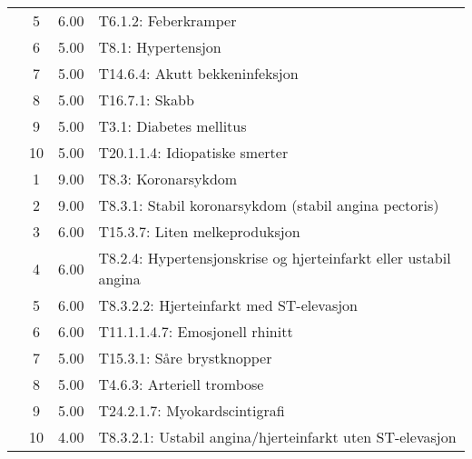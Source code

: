 \begin{table}[htbp]
\begin{tabular}{c c c l}
     & 5 & 6.00 & T6.1.2: Feberkramper \\
     & 6 & 5.00 & T8.1: Hypertensjon \\
     & 7 & 5.00 & T14.6.4: Akutt bekkeninfeksjon \\
     & 8 & 5.00 & T16.7.1: Skabb \\
     & 9 & 5.00 & T3.1: Diabetes mellitus \\
     & 10 & 5.00 & T20.1.1.4: Idiopatiske smerter \\
	\addlinespace
    4 & 1 & 9.00 & T8.3: Koronarsykdom \\
     & 2 & 9.00 & T8.3.1: Stabil koronarsykdom (stabil angina pectoris) \\
     & 3 & 6.00 & T15.3.7: Liten melkeproduksjon \\
     & 4 & 6.00 & T8.2.4: Hypertensjonskrise og hjerteinfarkt eller ustabil angina \\
     & 5 & 6.00 & T8.3.2.2: Hjerteinfarkt med ST-elevasjon \\
     & 6 & 6.00 & T11.1.1.4.7: Emosjonell rhinitt \\
     & 7 & 5.00 & T15.3.1: Såre brystknopper \\
     & 8 & 5.00 & T4.6.3: Arteriell trombose \\
     & 9 & 5.00 & T24.2.1.7: Myokardscintigrafi \\
     & 10 & 4.00 & T8.3.2.1: Ustabil angina/hjerteinfarkt uten ST-elevasjon \\
	\bottomrule
\end{tabular}
\end{table}

